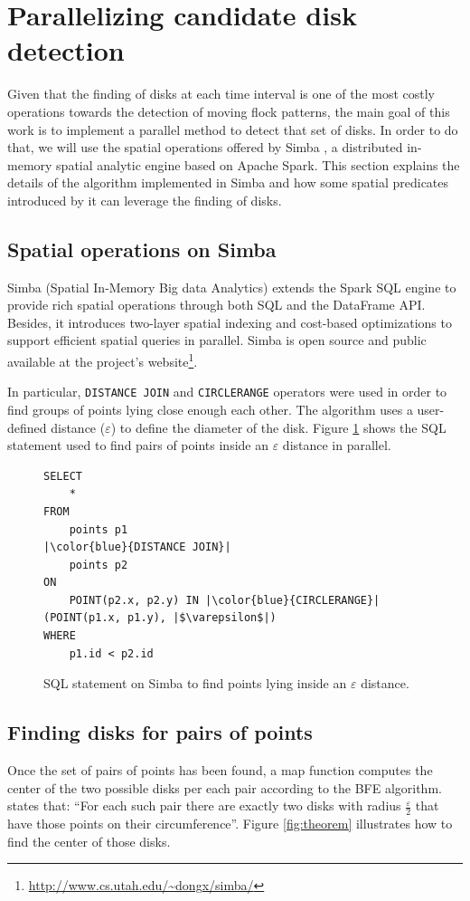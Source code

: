 \documentclass[12pt]{scrartcl}
\begin{document}
\section{Parallelizing candidate disk detection}\label{sec:candidates}

Given that the finding of disks at each time interval is one of the most costly operations towards the detection of moving flock patterns, the main goal of this work is to implement a parallel method to detect that set of disks.  In order to do that, we will use the spatial operations offered by Simba \citep{xie_simba:_2016-1}, a distributed in-memory spatial analytic engine based on Apache Spark. This section explains the details of the algorithm implemented in Simba and how some spatial predicates introduced by it can leverage the finding of disks.

\subsection{Spatial operations on Simba}
Simba (Spatial In-Memory Big data Analytics) extends the Spark SQL engine to provide rich spatial operations through both SQL and the DataFrame API.  Besides, it introduces two-layer spatial indexing and cost-based optimizations to support efficient spatial queries in parallel.  Simba is open source and public available at the project's website\footnote{\url{http://www.cs.utah.edu/~dongx/simba/}}.

In particular, \texttt{DISTANCE JOIN} and \texttt{CIRCLERANGE} operators were used in order to find groups of points lying close enough each other.  The algorithm uses a user-defined distance ($\varepsilon$) to define the diameter of the disk.  Figure \ref{fig:sql} shows the SQL statement used to find pairs of points inside an $\varepsilon$ distance in parallel.

\begin{figure}
 \centering
    \begin{verbatim}
SELECT 
	* 
FROM 
	points p1
|\color{blue}{DISTANCE JOIN}|
	points p2 
ON 
	POINT(p2.x, p2.y) IN |\color{blue}{CIRCLERANGE}|(POINT(p1.x, p1.y), |$\varepsilon$|)
WHERE 
	p1.id < p2.id
    \end{verbatim}
 \caption{SQL statement on Simba to find points lying inside an $\varepsilon$ distance.}
 \label{fig:sql}
\end{figure}

\subsection{Finding disks for pairs of points}
Once the set of pairs of points has been found, a map function computes the center of the two possible disks per each pair according to the BFE algorithm.  \cite{vieira_-line_2009} states that:  ``For each such pair there are exactly two disks with radius $\frac{\varepsilon}{2}$ that have those points on their circumference''.  Figure \ref{fig:theorem} illustrates how to find the center of those disks.
\end{document}
